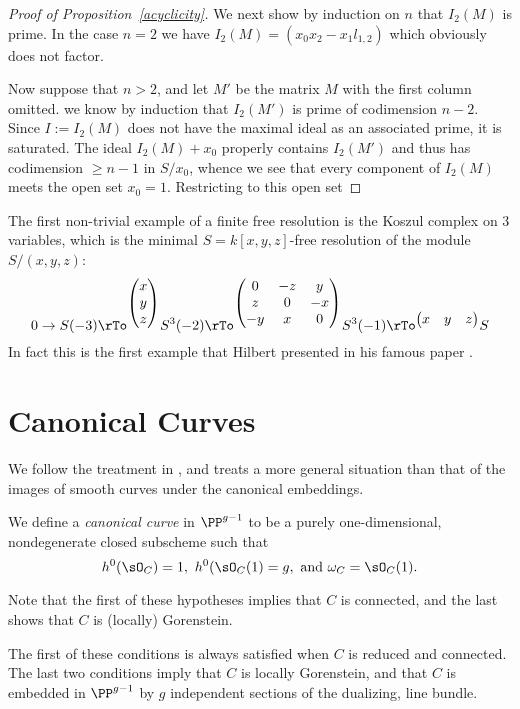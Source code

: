 \begin{proof}[Proof of Proposition~\ref{acyclicity}]
We next show by induction on $n$ that  $I_{2}(M)$ is prime. In the case $n=2$ we have $I_{2}(M) =  (x_{0}x_{2}-x_{1}l_{1,2})$ which obviously does not factor. 

Now suppose that $n>2$, and let $M'$ be the matrix $M$ with the first column omitted. we know by induction that $I_{2}(M')$ is prime of codimension $n-2$. Since $I:=I_{2}(M)$ does not have the maximal ideal as an associated prime, it is saturated. The ideal $I_{2}(M)+x_{0}$ properly contains $I_{2}(M')$ and thus has codimension $\geq n-1$ in $S/x_{0}$, whence we see that every component of $I_{2}(M)$ meets the open set
$x_{0} = 1$. Restricting to this open set 
\end{proof}

The first non-trivial example of a finite free resolution is the Koszul complex on 3 variables, which is the minimal $S = k[x,y,z]$-free resolution of the module $S/(x,y,z)$:
$$
0\to S(-3) \rTo^{
\begin{pmatrix}
x\\y\\z 
\end{pmatrix}}
 S^3(-2) \rTo^{\begin{pmatrix}
0&-z&y\\
z&0&-x\\
-y&x &0
\end{pmatrix}}
S^3(-1) \rTo^{
\begin{pmatrix}
x&y&z
\end{pmatrix}}
S
$$
In fact this is the first example that 
Hilbert
 presented in his famous paper \cite{Hilbert1890}. 																											

\section{Canonical Curves}
We follow the treatment in \cite{Schreyer}, and treats a more general situation than that of the 
images of smooth curves under the canonical embeddings.

We define a \emph{canonical curve} in $\PP^{g-1}$ to be a purely one-dimensional, nondegenerate closed subscheme  such that
$$
 h^{0}(\sO_{C}) = 1,\ h^{0}(\sO_{C}(1) = g, \hbox{ and } \omega_{C} = \sO_{C}(1).
$$

Note that the first of these hypotheses implies that $C$ is connected, and the last shows that
$C$ is (locally) Gorenstein.

The first of these conditions is always satisfied when $C$ is reduced and connected. The last two conditions imply that $C$ is locally Gorenstein, and that $C$ is embedded in $\PP^{g-1}$ by $g$ independent sections of the dualizing, line bundle.

